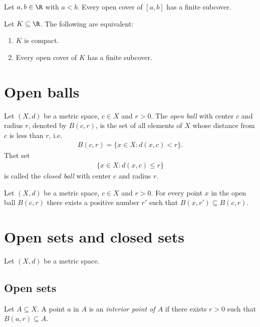 \documentclass{article}
\begin{document}
\begin{theorem}
	Let $a,b\in\R$ with $a<b$. Every open cover of $[a,b]$ has a finite subcover.
\end{theorem}

\begin{theorem}[2.21]
	Let $K\subseteq\R$. The following are equivalent:
	\begin{enumerate}
		\item $K$ is compact.
		\item Every open cover of $K$ has a finite subcover.
	\end{enumerate}
\end{theorem}

\section{Open balls}

\begin{definition}
	Let $(X,d)$ be a metric space, $c\in X$ and $r>0$. The \emph{open ball} with center $c$
	and radius $r$, denoted by $B(c,r)$, is the set of all elements of $X$ whose distance
	from $c$ is less than $r$, i.e.
	\begin{align*}
		B(c,r) = \{x\in X : d(x,c)<r\}.
	\end{align*}
	Thet set
	\begin{align*}
		\{x\in X: d(x,c)\leq r\}
	\end{align*}
	is called the \emph{closed ball} with center $c$ and radius $r$.
\end{definition}

\begin{proposition}[3.7]
	Let $(X,d)$ be a metric space, $c\in X$ and $r>0$. For every point $x$ in the open
	ball $B(c,r)$ there exists a positive number $r'$ such that $B(x,r')\subseteq B(c,r)$.
\end{proposition}

\section{Open sets and closed sets}

Let $(X,d)$ be a metric space.

\subsection{Open sets}

\begin{definition}
	Let $A\subseteq X$. A point $a$ in $A$ is
	an \emph{interior point of $A$} if there exists $r>0$ such that $B(a,r)\subseteq A$.
\end{definition}
\end{document}
